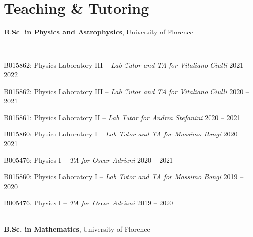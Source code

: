 \newcommand{\teaching}[2]
  {\normalsize
    \textbf{\color{hlcolor-0} #1}, {\color{hlcolor-1} #2}
  }


\section*{Teaching \& Tutoring}
\begin{cvcontent}
  \teaching{B.Sc. in Physics and Astrophysics}{University of Florence}
  \\ [0.5mm]
  \begin{itemize*}[label=\textcolor{iconcolor}{\textbullet}]
    \item B015862: Physics Laboratory III -- \emph{\small Lab Tutor and TA for Vitaliano Ciulli} \hfill {\normalsize \color{hlcolor-2} 2021 -- 2022}\\ [0.5mm]
    \item B015862: Physics Laboratory III -- \emph{\small Lab Tutor and TA for Vitaliano Ciulli} \hfill {\normalsize \color{hlcolor-2} 2020 -- 2021}\\ [0.5mm]
    \item B015861: Physics Laboratory II -- \emph{\small Lab Tutor for Andrea Stefanini} \hfill {\normalsize \color{hlcolor-2} 2020 -- 2021}\\ [0.5mm]
    \item B015860: Physics Laboratory I -- \emph{\small Lab Tutor and TA for Massimo Bongi} \hfill {\normalsize \color{hlcolor-2} 2020 -- 2021}\\ [0.5mm]
    \item B005476: Physics I -- \emph{\small TA for Oscar Adriani} \hfill {\normalsize \color{hlcolor-2} 2020 -- 2021}\\ [0.5mm]
    \item B015860: Physics Laboratory I -- \emph{\small Lab Tutor and TA for Massimo Bongi} \hfill {\normalsize \color{hlcolor-2} 2019 -- 2020}\\ [0.5mm]
    \item B005476: Physics I -- \emph{\small TA for Oscar Adriani} \hfill {\normalsize \color{hlcolor-2} 2019 -- 2020}
  \end{itemize*}
  \\ [3mm]
  \teaching{B.Sc. in Mathematics}{University of Florence}
  \\ [0.5mm]
  \begin{itemize*}[label=\textcolor{iconcolor}{\textbullet}]

\end{itemize*}
\end{cvcontent}
